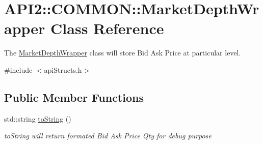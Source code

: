 \hypertarget{class_a_p_i2_1_1_c_o_m_m_o_n_1_1_market_depth_wrapper}{\section{A\-P\-I2\-:\-:C\-O\-M\-M\-O\-N\-:\-:Market\-Depth\-Wrapper Class Reference}
\label{class_a_p_i2_1_1_c_o_m_m_o_n_1_1_market_depth_wrapper}
}


The \hyperlink{class_a_p_i2_1_1_c_o_m_m_o_n_1_1_market_depth_wrapper}{Market\-Depth\-Wrapper} class will store Bid Ask Price at particular level.  




{\ttfamily \#include $<$api\-Structs.\-h$>$}

\subsection*{Public Member Functions}
\begin{DoxyCompactItemize}
\item 
std\-::string \hyperlink{class_a_p_i2_1_1_c_o_m_m_o_n_1_1_market_depth_wrapper_a1194255ba38a71e92dd66d8f2559fbf8}{to\-String} ()
\begin{DoxyCompactList}\small\item\em to\-String will return formated Bid Ask Price Qty for debug purpose \end{DoxyCompactList}\end{DoxyCompactItemize}
